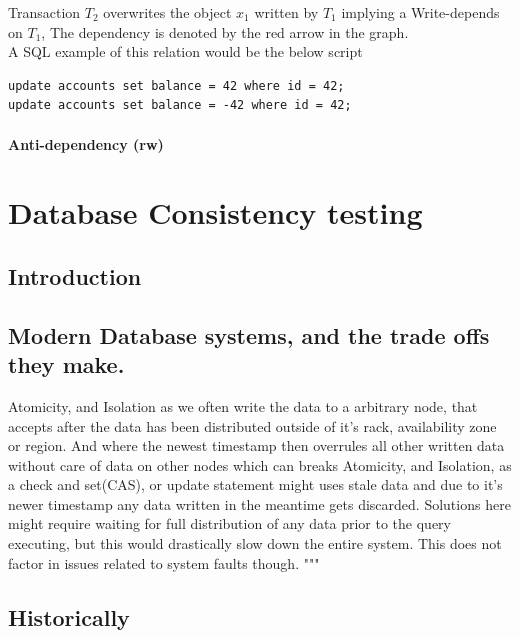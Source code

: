 \documentclass[a4paper,10pt,titlepage]{report}
\begin{document}
Transaction $T_2$ overwrites the object $x_1$ written by $T_1$ implying a Write-depends on $T_1$, The dependency is denoted by the red arrow in the graph. \\

A SQL example of this relation would be the below script

\begin{lstlisting}
update accounts set balance = 42 where id = 42;
update accounts set balance = -42 where id = 42;
\end{lstlisting}

\subsubsection{Anti-dependency (rw)}
        
        
 

    \newpage

    \chapter{Database Consistency testing}

    \section{Introduction}


    \section{Modern Database systems, and the trade offs they make.}

    Atomicity, and Isolation as we often write the data to a arbitrary node, that accepts after the data has been distributed outside of it's rack, availability zone or region. And where the newest timestamp then overrules all other written data without care of data on other nodes which can breaks Atomicity, and Isolation, as a check and set(CAS), or update statement might uses stale data and due to it's newer timestamp any data written in the meantime gets discarded. Solutions here might require waiting for full distribution of any data prior to the query executing, but this would drastically slow down the entire system. This does not factor in issues related to system faults though.
    """


    \section{Historically}
\end{document}
